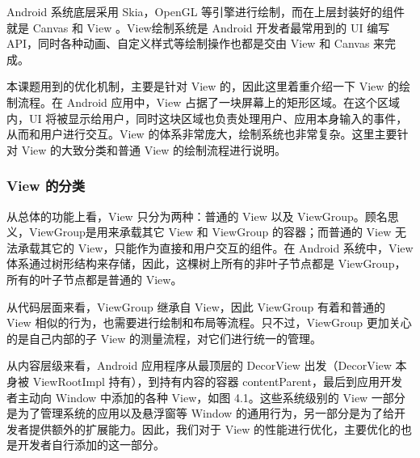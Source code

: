 Android 系统底层采用 Skia，OpenGL 等引擎进行绘制，而在上层封装好的组件就是 Canvas 和 View \cite{tahir2013learning}。View绘制系统是 Android 开发者最常用到的 UI 编写 API，同时各种动画、自定义样式等绘制操作也都是交由 View 和 Canvas 来完成。

本课题用到的优化机制，主要是针对 View 的，因此这里着重介绍一下 View 的绘制流程。在 Android 应用中，View 占据了一块屏幕上的矩形区域。在这个区域内，UI 将被显示给用户，同时这块区域也负责处理用户、应用本身输入的事件，从而和用户进行交互\cite{aljarrah2016maintaining}。View 的体系非常庞大，绘制系统也非常复杂。这里主要针对 View 的大致分类和普通 View 的绘制流程进行说明。

\subsubsection*{View 的分类}

从总体的功能上看，View 只分为两种：普通的 View 以及 ViewGroup。顾名思义，ViewGroup是用来承载其它 View 和 ViewGroup 的容器；而普通的 View 无法承载其它的 View，只能作为直接和用户交互的组件。在 Android 系统中，View 体系通过树形结构来存储，因此，这棵树上所有的非叶子节点都是 ViewGroup，所有的叶子节点都是普通的 View。

从代码层面来看，ViewGroup 继承自 View，因此 ViewGroup 有着和普通的 View 相似的行为，也需要进行绘制和布局等流程。只不过，ViewGroup 更加关心的是自己内部的子 View 的测量流程，对它们进行统一的管理。\

从内容层级来看，Android 应用程序从最顶层的 DecorView 出发（DecorView 本身被 ViewRootImpl 持有），到持有内容的容器 contentParent，最后到应用开发者主动向 Window 中添加的各种 View，如图 4.1。这些系统级别的 View 一部分是为了管理系统的应用以及悬浮窗等 Window 的通用行为，另一部分是为了给开发者提供额外的扩展能力。因此，我们对于 View 的性能进行优化，主要优化的也是开发者自行添加的这一部分。


